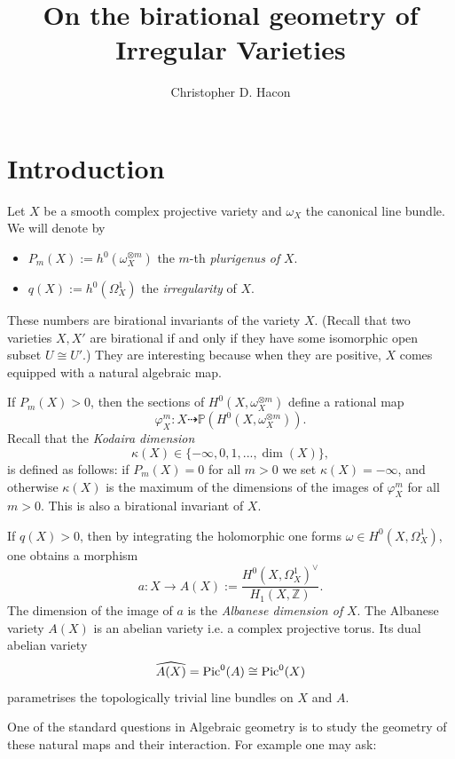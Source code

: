 \documentclass[10pt]{amsart}
\title{On the birational geometry of Irregular Varieties}
\author {Christopher D. Hacon}
\date{}
\newcommand\Pic{{\text{\rm Pic}}}
\newcommand\alb{{ a}}
\newcommand\lra{\longrightarrow}
\newcommand\Alb{{ A}}
\newcommand\ot{{\otimes}}
\newcommand\PPP{{\mathbb{P}}}
\newcommand\Z{{\mathbb{Z}}}
\begin{document}
 \endabstract
 \maketitle
 \section{Introduction}
Let $X$ be a smooth complex projective variety
and $\omega _X$ the canonical
 line bundle. We will denote by
\begin{itemize}
\item $P_m(X):= h^0(\omega _X^{\ot m})$ the $m$-th {\em plurigenus of} $X$.
\item $q(X):=h^0(\Omega ^1_X)$ the {\em irregularity} of $X$.
\end{itemize}
These numbers are birational invariants of the variety $X$. (Recall that
two varieties $X,X'$ are birational if and only if they have 
some isomorphic open subset $U\cong U'$.)
They are interesting because when they are positive, $X$ comes
equipped with a natural algebraic map.

If $P_m(X)>0$, then the sections of $H^0(X,\omega _X^{\ot m})$  
define a rational map
$$\varphi ^m_X:X \dashrightarrow \PPP \left( 
H^0(X,\omega _X ^{\ot m})\right) .$$
Recall that the {\em Kodaira dimension}  
$$\kappa (X)\in \{-\infty,0,1,...,\dim (X)\},$$ 
is defined as follows: if $P_m(X)=0$ for all
$m>0$ we set $\kappa (X)=-\infty$, and otherwise $\kappa (X)$ is 
the maximum of the dimensions of the images
of $\varphi ^m_X$ for all $m>0$. This is also a birational invariant of $X$.

If $q(X)>0$, then by integrating the holomorphic one forms
$\omega \in H^0(X,\Omega ^1_X)$, one obtains a morphism
$$\alb :X \lra \Alb (X):= \frac {H^0(X,\Omega ^1_X)^\vee }{H_1(X,\Z )}.$$
The dimension of the image of $\alb$ is the {\em Albanese dimension of} $X$.
The Albanese variety $\Alb (X)$ is an abelian variety i.e. a complex 
projective torus. Its dual abelian variety 
$$\widehat {\Alb (X)}=\Pic ^0(\Alb )\cong\Pic ^0(X)$$
parametrises the topologically trivial line bundles on $X$ and $\Alb$.

One of the standard questions in Algebraic geometry is to study the 
geometry of these natural maps and their interaction.
For example one may ask:
\end{document}
